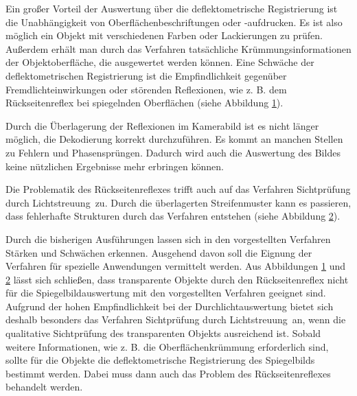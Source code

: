 \noindent
Ein großer Vorteil der Auswertung über die deflektometrische Registrierung ist die Unabhängigkeit von Oberflächenbeschriftungen oder -aufdrucken.
Es ist also möglich ein Objekt mit verschiedenen Farben oder Lackierungen zu prüfen.
Außerdem erhält man durch das Verfahren tatsächliche Krümmungsinformationen der Objektoberfläche, die ausgewertet werden können.
Eine Schwäche der deflektometrischen Registrierung ist die Empfindlichkeit gegenüber Fremdlichteinwirkungen oder störenden Reflexionen, wie z. B. dem Rückseitenreflex bei spiegelnden Oberflächen (siehe Abbildung \ref{tikz:abbRückseitenreflexRegistrierung}).

{
	\begin{figure}[H]
		\centering
		
		\label{tikz:abbRückseitenreflexRegistrierung}
	\end{figure}
}

\noindent
Durch die Überlagerung der Reflexionen im Kamerabild ist es nicht länger möglich, die Dekodierung korrekt durchzuführen.
Es kommt an manchen Stellen zu Fehlern und Phasensprüngen.
Dadurch wird auch die Auswertung des Bildes keine nützlichen Ergebnisse mehr erbringen können.

\p
Die Problematik des Rückseitenreflexes trifft auch auf das Verfahren \glqq Sichtprüfung durch Lichtstreuung\grqq ~zu.
Durch die überlagerten Streifenmuster kann es passieren, dass fehlerhafte Strukturen durch das Verfahren entstehen (siehe Abbildung \ref{tikz:abbRückseitenreflexLichtstreuung}).

{
	\begin{figure}[H]
		\centering
		
		\label{tikz:abbRückseitenreflexLichtstreuung}
	\end{figure}
}

\noindent
Durch die bisherigen Ausführungen lassen sich in den vorgestellten Verfahren Stärken und Schwächen erkennen.
Ausgehend davon soll die Eignung der Verfahren für spezielle Anwendungen vermittelt werden.
Aus Abbildungen \ref{tikz:abbRückseitenreflexRegistrierung} und \ref{tikz:abbRückseitenreflexLichtstreuung} lässt sich schließen, dass transparente Objekte durch den Rückseitenreflex nicht für die Spiegelbildauswertung mit den vorgestellten Verfahren geeignet sind.
Aufgrund der hohen Empfindlichkeit bei der Durchlichtauswertung bietet sich deshalb besonders das Verfahren \glqq Sichtprüfung durch Lichtstreuung\grqq ~an, wenn die qualitative Sichtprüfung des transparenten Objekts ausreichend ist.
Sobald weitere Informationen, wie z. B. die Oberflächenkrümmung erforderlich sind, sollte für die Objekte die deflektometrische Registrierung des Spiegelbilds bestimmt werden.
Dabei muss dann auch das Problem des Rückseitenreflexes behandelt werden.

